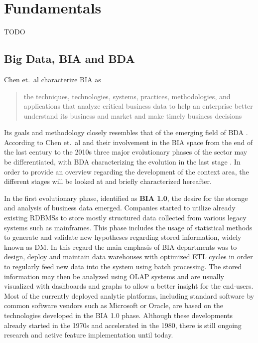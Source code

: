 \chapter{Fundamentals}
\label{chap:fund}

TODO

\section{Big Data, \acl{BIA} and \acl{BDA}}

Chen et.~al characterize \ac{BIA} as \blockcquote[p.~1166]{chen2012business}{the techniques, technologies, systems, practices, methodologies, and applications that analyze critical business data to help an enterprise better understand its business and market and make timely business decisions}. Its goals and methodology closely resembles that of the emerging field of \ac{BDA} \autocite[][p.~1166]{chen2012business}. 
According to Chen et.~al and their involvement in the \ac{BIA} space from the end of the last century to the 2010s three major evolutionary phases of the sector may be differentiated, with \ac{BDA} characterizing the evolution in the last stage \autocite[][p.~1168 \psqq]{chen2012business}. In order to provide an overview regarding the development of the context area, the different stages will be looked at and briefly characterized hereafter.

In the first evolutionary phase, identified as \textbf{\ac{BIA} 1.0}, the desire for the storage and analysis of business data emerged. Companies started to utilize already existing \acp{RDBMS} to store mostly structured data collected from various legacy systems such as mainframes. This phase includes the usage of statistical methods to generate and validate new hypotheses regarding stored information, widely known as \ac{DM}. In this regard the main emphasis of \ac{BIA} departments was to design, deploy and maintain data warehouses with optimized \ac{ETL} cycles in order to regularly feed new data into the system using batch processing. The stored information may then be analyzed using \ac{OLAP} systems and are usually visualized with dashboards and graphs to allow a better insight for the end-users.
Most of the currently deployed analytic platforms, including standard software by common software vendors such as Microsoft or Oracle, are based on the technologies developed in the \ac{BIA} 1.0 phase. Although these developments already started in the 1970s and accelerated in the 1980, there is still ongoing research and active feature implementation until today. \autocite[Cmp.][p.~1166 \psq]{chen2012business}


